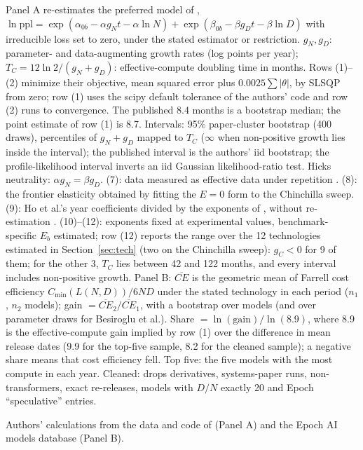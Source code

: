 \begin{table}[tp]
\begin{tablenotes}
Panel A re-estimates the preferred model of \citet{ho2024algorithmic}, $\ln\text{ppl}=\exp(\alpha_{0b}-\alpha g_N t-\alpha\ln N)+\exp(\beta_{0b}-\beta g_D t-\beta\ln D)$ with irreducible loss set to zero, under the stated estimator or restriction. $g_N,g_D$: parameter- and data-augmenting growth rates (log points per year); $T_C=12\ln2/(g_N+g_D)$: effective-compute doubling time in months. Rows (1)--(2) minimize their objective, mean squared error plus $0.0025\sum|\theta|$, by SLSQP from zero; row (1) uses the scipy default tolerance of the authors' code and row (2) runs to convergence. The published 8.4 months is a bootstrap median; the point estimate of row (1) is 8.7. Intervals: 95\% paper-cluster bootstrap (400 draws), percentiles of $g_N+g_D$ mapped to $T_C$ ($\infty$ when non-positive growth lies inside the interval); the published interval is the authors' iid bootstrap; the profile-likelihood interval inverts an iid Gaussian likelihood-ratio test. Hicks neutrality: $\alpha g_N=\beta g_D$. (7): data measured as effective data under repetition \citep{muennighoff2023scaling}. (8): the frontier elasticity obtained by fitting the $E=0$ form to the Chinchilla sweep. (9): Ho et al.'s year coefficients divided by the exponents of \citet{besiroglu2024chinchilla}, without re-estimation \citep{whitfill2025note}. (10)--(12): exponents fixed at experimental values, benchmark-specific $E_b$ estimated; row (12) reports the range over the 12 technologies estimated in Section~\ref{sec:tech} (two on the Chinchilla sweep): $g_C<0$ for 9 of them; for the other 3, $T_C$ lies between 42 and 122 months, and every interval includes non-positive growth. Panel B: $\overline{CE}$ is the geometric mean of Farrell cost efficiency $C_{\min}(L(N,D))/6ND$ under the stated technology in each period ($n_1$, $n_2$ models); gain $=\overline{CE}_2/\overline{CE}_1$, with a bootstrap over models (and over parameter draws for Besiroglu et al.). Share $=\ln(\text{gain})/\ln(8.9)$, where 8.9 is the effective-compute gain implied by row (1) over the difference in mean release dates (9.9 for the top-five sample, 8.2 for the cleaned sample); a negative share means that cost efficiency fell. Top five: the five models with the most compute in each year. Cleaned: drops derivatives, systems-paper runs, non-transformers, exact re-releases, models with $D/N$ exactly 20 and Epoch ``speculative'' entries.
\end{tablenotes}
\begin{tablenotes}[Source]
Authors' calculations from the data and code of \citet{ho2024algorithmic} (Panel A) and the Epoch AI models database \citep{epochai2026data} (Panel B).
\end{tablenotes}
\end{table}
